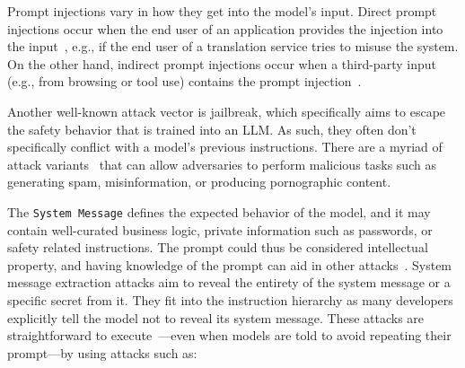 Prompt injections vary in how they get into the model's input.
Direct prompt injections occur when the end user of an application provides the injection into the input~\citep{perez2022ignore,toyer2023tensor}, e.g., if the end user of a translation service tries to misuse the system. %
On the other hand, indirect prompt injections occur when a third-party input (e.g., from browsing or tool use) contains the prompt injection~\citep{greshake2023not}.%

 Another well-known attack vector is jailbreak, which specifically aims to escape the safety behavior that is trained into an LLM. As such, they often don't specifically conflict with a model's previous instructions. There are a myriad of attack variants~\citep{schulhoff2023ignore,zou2023universal,wei2024jailbroken} that can allow adversaries to perform malicious tasks such as generating spam, misinformation, or producing pornographic content.

\begin{tcolorbox}[left=1mm, right=1.5mm, top=1.5mm, bottom=1mm]
\end{tcolorbox}

 The \texttt{System Message} defines the expected behavior of the model, and it may contain well-curated business logic, private information such as passwords, or safety related instructions. The prompt could thus be considered intellectual property, and having knowledge of the prompt can aid in other attacks~\citep{toyer2023tensor}.
System message extraction attacks aim to reveal the entirety of the system message or a specific secret from it. They fit into the instruction hierarchy as many developers explicitly tell the model not to reveal its system message. These attacks are straightforward to execute~\citep{perez2022ignore,zhang2023prompts,schulhoff2023ignore}---even when models are told to avoid repeating their prompt---by using attacks such as:

